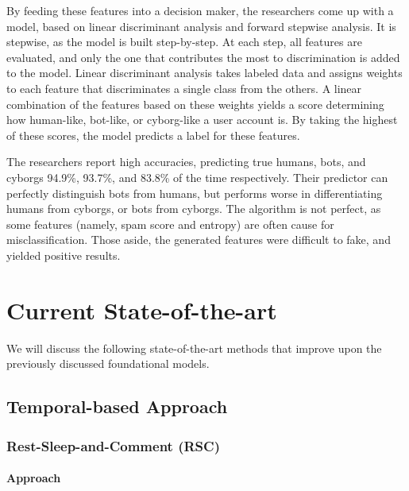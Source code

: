 \documentclass[11pt, oneside]{article}   	%
\begin{document}
\quad By feeding these features into a decision maker, the researchers come up
with a model, based on linear discriminant analysis and forward stepwise
analysis.  It is stepwise, as the model is built step-by-step.  At each step,
all features are evaluated, and only the one that contributes the most to
discrimination is added to the model.  Linear discriminant analysis takes
labeled data and assigns weights to each feature that discriminates a single
class from the others.  A linear combination of the features based on these
weights yields a score determining how human-like, bot-like, or cyborg-like a
user account is.  By taking the highest of these scores, the model predicts a
label for these features.

\quad The researchers report high accuracies, predicting true humans, bots, and
cyborgs 94.9\%, 93.7\%, and 83.8\% of the time respectively.  Their predictor
can perfectly distinguish bots from humans, but performs worse in
differentiating humans from cyborgs, or bots from cyborgs. The algorithm is not
perfect, as some features (namely, spam score and entropy) are often cause for
misclassification. Those aside, the generated features were difficult to fake,
and yielded positive results.

\section{Current State-of-the-art}  \label{cur_models}

\quad We will discuss the following state-of-the-art methods that improve upon the previously discussed foundational models.

\subsection{Temporal-based Approach}
\subsubsection{Rest-Sleep-and-Comment (RSC) }

\paragraph{Approach}
\quad
\end{document}

